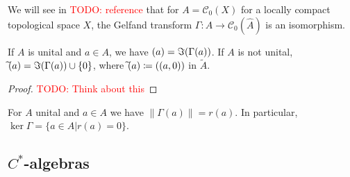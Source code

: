 \documentclass[american]{scrartcl}
\newcommand{\todo}[1]{\textcolor{red}{TODO: #1}}
\renewcommand{\norm}[1]{\left\lVert #1 \right\rVert}
\newcommand{\cC}{\mathcal{C}}
\let\sp\relax
\begin{document}
\begin{example}
	We will see in \todo{reference} that for $A=\cC_0(X)$ for a locally compact topological space $X$, the Gelfand transform $\Gamma\colon A\to \cC_0(\hat{A})$ is an isomorphism.
\end{example}
\begin{proposition}
	If $A$ is unital and $a\in A$, we have $\sp(a)=\Im(\Gamma(a))$. If $A$ is not unital, $\widetilde{\sp}(a)=\Im(\Gamma(a))\cup\{0\}$, where $\widetilde{\sp}(a)\coloneqq \sp{((a,0))}$ in $\tilde{A}$.
\end{proposition}
\begin{proof}
	\todo{Think about this}
\end{proof}
\begin{corollary}
	For $A$ unital and $a\in A$ we have $\norm{\Gamma(a)}=r(a)$. In particular, $\ker \Gamma=\{a\in A|r(a)=0\}$.
\end{corollary}
\subsection{$C^*$-algebras}
\end{document}
